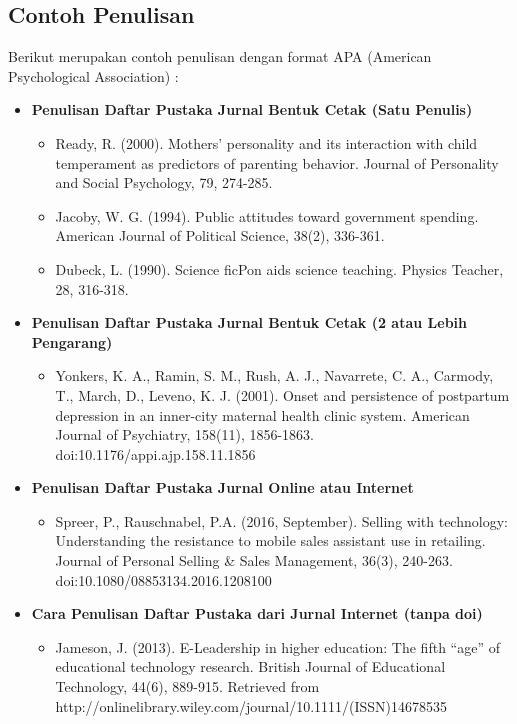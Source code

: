 \subsection{Contoh Penulisan}
Berikut merupakan contoh penulisan dengan format APA (American Psychological Association) :
\begin{itemize}
    \item \textbf{Penulisan Daftar Pustaka Jurnal Bentuk Cetak (Satu Penulis)}
    \begin{itemize}
        \item Ready, R. (2000). Mothers’ personality and its interaction with child temperament as predictors of parenting behavior. Journal of Personality and Social Psychology, 79, 274-285.
        \item Jacoby, W. G. (1994). Public attitudes toward government spending. American Journal of Political Science, 38(2), 336-361.
        \item  Dubeck, L. (1990). Science ﬁcPon aids science teaching. Physics Teacher, 28, 316-318.
    \end{itemize}
    \item \textbf{Penulisan Daftar Pustaka Jurnal Bentuk Cetak (2 atau Lebih Pengarang)}
    \begin{itemize}
        \item Yonkers, K. A., Ramin, S. M., Rush, A. J., Navarrete, C. A., Carmody, T., March, D., Leveno, K. J. (2001). Onset and persistence of postpartum depression in an inner-city maternal health clinic system. American Journal of Psychiatry, 158(11), 1856-1863. doi:10.1176/appi.ajp.158.11.1856        
    \end{itemize}
    \item \textbf{Penulisan Daftar Pustaka Jurnal Online atau Internet}
    \begin{itemize}
        \item Spreer, P., Rauschnabel, P.A. (2016, September). Selling with technology: Understanding the resistance to mobile sales assistant use in retailing. Journal of Personal Selling \& Sales Management, 36(3), 240-263. doi:10.1080/08853134.2016.1208100        
    \end{itemize}
    \item \textbf{Cara Penulisan Daftar Pustaka dari Jurnal Internet (tanpa doi)}
    \begin{itemize}
        \item Jameson, J. (2013). E-Leadership in higher education: The ﬁfth “age” of educational technology research. British Journal of Educational Technology, 44(6), 889-915. Retrieved from http://onlinelibrary.wiley.com/journal/10.1111/(ISSN)14678535       
    \end{itemize}
\end{itemize}



